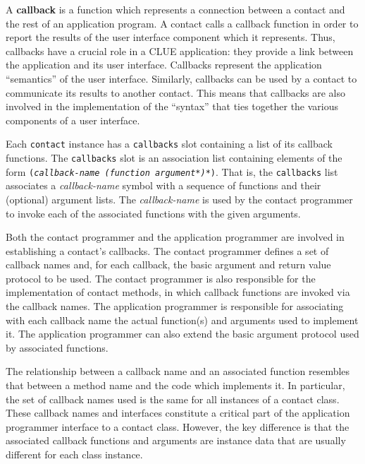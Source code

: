 \documentclass[twoside]{book}
\begin{document}
\begin{sloppy}
A {\bf callback} is a function which represents a connection
between a contact and the rest of an application program. A contact calls a
callback function in order to report the results of the user interface component
which it represents. Thus, callbacks have a crucial role in a CLUE application:
they provide a link between the application and its user interface. Callbacks
represent the application ``semantics'' of the user interface.
Similarly, callbacks can be used by a contact to communicate its results to
another contact. This means that callbacks are also involved in the
implementation of the ``syntax'' that ties together the various components of a
user interface. 

Each {\tt contact} instance has a {\tt callbacks} slot containing a list of its
callback functions. The {\tt callbacks} slot is an association list containing
elements of the form 
{\tt ({\em callback-name (function argument*)*})}.
That is, the {\tt callbacks} list associates a {\em callback-name} symbol with a
sequence of functions and their (optional) argument lists. The {\em
callback-name} is used by the contact programmer to invoke each of the
associated functions with the given arguments.

Both the contact programmer and the application programmer are involved in
establishing a contact's callbacks. The contact programmer defines a set of
callback names and, for each callback, the basic argument and return value
protocol to be used. The contact programmer is also responsible for the
implementation of contact methods, in which callback functions are invoked via
the callback names. The application programmer is responsible for associating
with each callback name the actual function(s) and arguments used to implement
it. The application programmer can also extend the basic argument protocol used
by associated functions.

The relationship between a callback name and an associated function resembles
that between a method name and the code which implements it. In particular, the
set of callback names used is the same for all instances of a contact class.
These callback names and interfaces constitute a critical part of the
application programmer interface to a contact class.
However, the key difference is that the associated callback functions and
arguments are instance data that are usually different for each class instance.


\end{sloppy}
\end{document}
